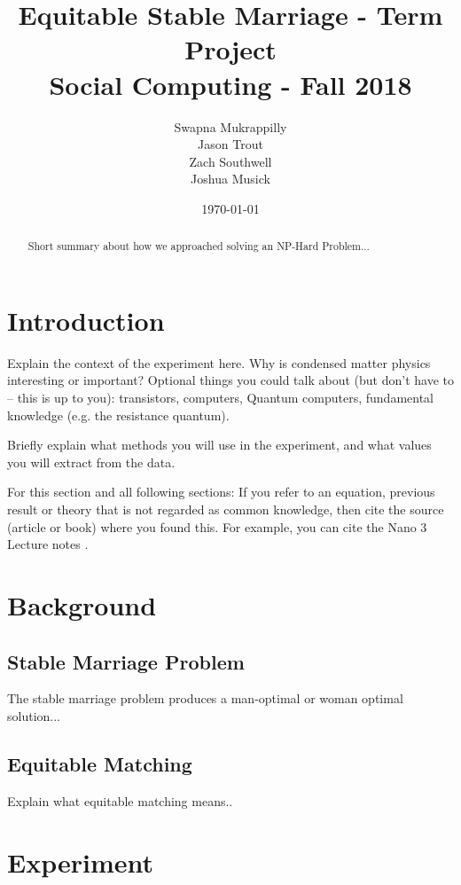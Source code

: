 \documentclass[a4paper]{article}
\title{Equitable Stable Marriage - Term Project\\Social Computing - Fall 2018}
\author{Swapna Mukrappilly\\Jason Trout\\Zach Southwell\\Joshua Musick}
\date{\today}
\begin{document}
\maketitle

\begin{abstract}
Short summary about how we approached solving an NP-Hard Problem...
\end{abstract}

\section{Introduction}
\label{sec:introduction}

Explain the context of the experiment here. Why is condensed matter physics interesting or important?
Optional things you could talk about (but don't have to -- this is up to you): transistors, computers, Quantum computers, fundamental knowledge (e.g. the resistance quantum).

Briefly explain what methods you will use in the experiment, and what values you will extract from the data.

For this section and all following sections: If you refer to an equation, previous result or theory that is not regarded as common knowledge, then cite the source (article or book) where you found this. For example, you can cite the Nano 3 Lecture notes \cite{nano3}.


\section{Background}
\label{sec:background}

\subsection{Stable Marriage Problem}
The stable marriage problem produces a man-optimal or woman optimal solution...

\subsection{Equitable Matching}
Explain what equitable matching means..


\section{Experiment}
\end{document}
